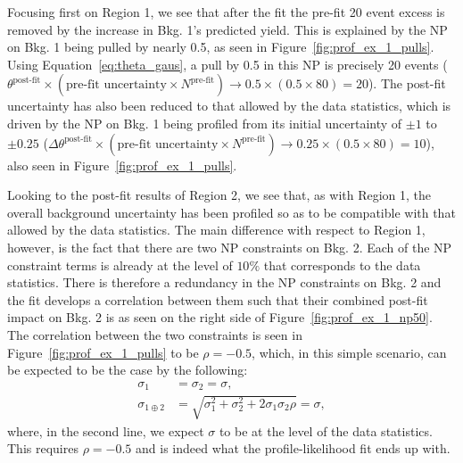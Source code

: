 Focusing first on Region 1, we see that after the fit the pre-fit 20 event excess is removed by
the increase in Bkg. 1's predicted yield.
This is explained by the NP on Bkg. 1 being pulled by nearly 0.5, as seen in Figure~\ref{fig:prof_ex_1_pulls}.
Using Equation~\ref{eq:theta_gaus}, a pull by 0.5 in this NP is precisely 20 events ($\theta^{\text{post-fit}} \times ( \text{pre-fit uncertainty} \times N^{\text{pre-fit}}) \rightarrow 0.5 \times (0.5 \times 80) = 20$).
The post-fit uncertainty has also been reduced to that allowed by the data statistics, which is driven
by the NP on Bkg. 1 being profiled from its initial uncertainty of $\pm 1$ to $\pm 0.25$ ($\Delta \theta^{\text{post-fit}} \times (\text{pre-fit uncertainty} \times N^{\text{pre-fit}}) \rightarrow 0.25 \times (0.5 \times 80) = 10$), also seen in Figure~\ref{fig:prof_ex_1_pulls}.

Looking to the post-fit results of Region 2, we see that, as with Region 1, the overall
background uncertainty has been profiled so as to be compatible with that allowed by the data statistics.
The main difference with respect to Region 1, however, is the fact that there are two NP constraints
on Bkg. 2.
Each of the NP constraint terms is already at the level of $10\%$ that corresponds to the data statistics.
There is therefore a redundancy in the NP constraints on Bkg. 2 and the fit develops a correlation between
them such that their combined post-fit impact on Bkg. 2 is as seen on the right side of Figure~\ref{fig:prof_ex_1_np50}.
The correlation between the two constraints is seen in Figure~\ref{fig:prof_ex_1_pulls} to be $\rho = -0.5$,
which, in this simple scenario, can be expected to be the case by the following:
\begin{align}
    \sigma_{1} &= \sigma_{2} = \sigma, \nonumber \\
    \sigma_{1 \oplus 2} &= \sqrt{ \sigma_1^2 + \sigma_2^2 + 2 \sigma_1 \sigma_2 \rho } = \sigma, \nonumber
\end{align}
where, in the second line, we expect $\sigma$ to be at the level of the data statistics.
This requires $\rho = -0.5$ and is indeed what the profile-likelihood fit ends up with.

